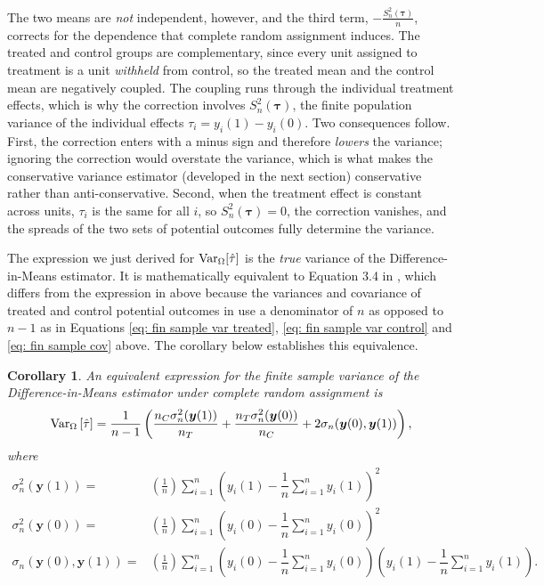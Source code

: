 \documentclass[12pt,leqno]{article}
\theoremstyle{newstyle}
\newtheorem{cor}{Corollary}
\newcommand{\bZ}{\bm{Z}}   \newcommand{\bz}{\bm{z}}   %
\newcommand{\po}[2]{y_{#1}(#2)}     %
\newcommand{\pov}[1]{\bm{y}(#1)}    %
\newcommand{\tauhat}{\hat{\tau}}
\newcommand{\Ssq}[2][n]{S_{#1}^{2}(#2)}
\newcommand{\ssq}[2][n]{\sigma_{#1}^{2}(#2)}
\newcommand{\scov}[2][n]{\sigma_{#1}(#2)}
\begin{document}
The two means are \textit{not} independent, however, and the third term, $-\frac{\Ssq{\bm{\tau}}}{n}$, corrects for the dependence that complete random assignment induces. The treated and control groups are complementary, since every unit assigned to treatment is a unit \textit{withheld} from control, so the treated mean and the control mean are negatively coupled. The coupling runs through the individual treatment effects, which is why the correction involves $\Ssq{\bm{\tau}}$, the finite population variance of the individual effects $\tau_i = \po{i}{1} - \po{i}{0}$. Two consequences follow. First, the correction enters with a minus sign and therefore \textit{lowers} the variance; ignoring the correction would overstate the variance, which is what makes the conservative variance estimator (developed in the next section) conservative rather than anti-conservative. Second, when the treatment effect is constant across units, $\tau_i$ is the same for all $i$, so $\Ssq{\bm{\tau}} = 0$, the correction vanishes, and the spreads of the two sets of potential outcomes fully determine the variance.

The expression we just derived for $\VarZ[\tauhat]$ is the \textit{true} variance of the Difference-in-Means estimator. It is mathematically equivalent to Equation 3.4 in \citet[][57]{gerbergreen2012}, which differs from the expression in  above because the variances and covariance of treated and control potential outcomes in \citet[][Equation 3.4, 57]{gerbergreen2012} use a denominator of $n$ as opposed to $n - 1$ as in Equations \eqref{eq: fin sample var treated}, \eqref{eq: fin sample var control} and \eqref{eq: fin sample cov} above. The corollary below establishes this equivalence.

\begin{cor}
An equivalent expression for the finite sample variance of the Difference-in-Means estimator under complete random assignment is
\begin{equation}
\VarZ\left[\tauhat\right] = \dfrac{1}{n - 1}\left(\dfrac{n_C\ssq{\pov{1}}}{n_T} + \dfrac{n_T \ssq{\pov{0}}}{n_C} + 2 \scov{\pov{0}, \pov{1}}\right),
\end{equation}
where
\begin{align}
\ssq{\pov{1}} = & \left(\frac{1}{n}\right)\sum \limits_{i = 1}^n \left(\po{i}{1} - \dfrac{1}{n} \sum \limits_{i = 1}^n \po{i}{1}\right)^2 \label{eq: fin pop var treated} \\
\ssq{\pov{0}} = & \left(\frac{1}{n}\right)\sum \limits_{i = 1}^n \left(\po{i}{0} - \dfrac{1}{n} \sum \limits_{i = 1}^n \po{i}{0}\right)^2 \label{eq: fin pop var control} \\
\scov{\pov{0}, \pov{1}} = & \left(\frac{1}{n}\right)\sum \limits_{i = 1}^n \left(\po{i}{0} - \dfrac{1}{n} \sum \limits_{i = 1}^n \po{i}{0}\right)\left(\po{i}{1} - \dfrac{1}{n} \sum \limits_{i = 1}^n \po{i}{1}\right). \label{eq: fin pop cov}
\end{align}
\end{cor}
\end{document}
